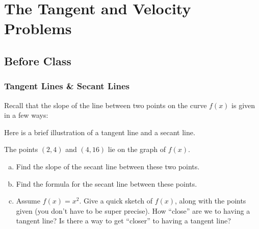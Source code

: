 \documentclass[notes]{subfiles}
\begin{document}
	\fancyhead[LO,RE]{\bfseries \currentname}
	\fancyfoot[C]{{}}
	\fancyfoot[RO,LE]{\large \thepage}	%
	
\section*{The Tangent and Velocity Problems}\label{cs14}
	\subsection*{Before Class}
	\subsubsection*{Tangent Lines \& Secant Lines}
		Recall that the slope of the line between two points on the curve $f(x)$ is given in a few ways:
		

		\begin{defn}
			
		\end{defn}
		Here is a brief illustration of a tangent line and a secant line.
			\newpage
			
		\begin{ex}
			The points $(2,4)$ and $(4,16)$ lie on the graph of $f(x)$.  
			\begin{enumerate}[(a)]
				\item Find the slope of the secant line between these two points.
				\item Find the formula for the secant line between these points.
					
				\item Assume $f(x) = x^2$.  Give a quick sketch of $f(x)$, along with the points given (you don't have to be super precise).  How ``close'' are we to having a tangent line?  Is there a way to get ``closer'' to having a tangent line?
			\end{enumerate}
		\end{ex}
			\newpage
						
\end{document}
